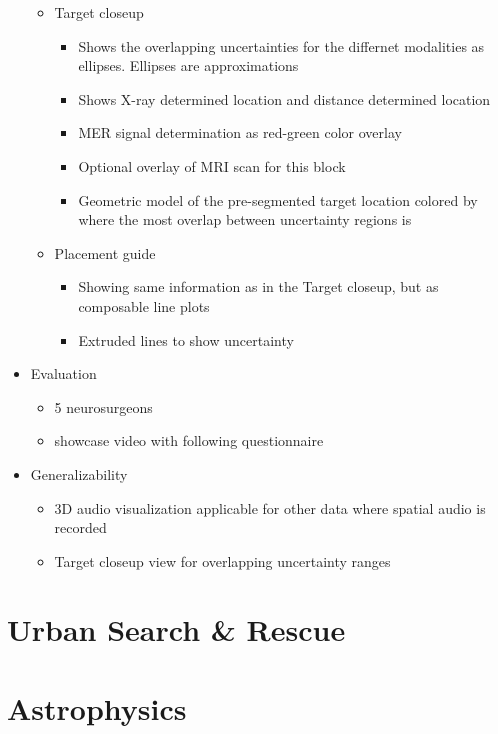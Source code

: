 \begin{itemize}
\begin{itemize}
    \item Target closeup
    \begin{itemize}
        \item Shows the overlapping uncertainties for the differnet modalities as ellipses. Ellipses are approximations
        \item Shows X-ray determined location and distance determined location
        \item MER signal determination as red-green color overlay
        \item Optional overlay of MRI scan for this block
        \item Geometric model of the pre-segmented target location colored by where the most overlap between uncertainty regions is
    \end{itemize}
    \item Placement guide
    \begin{itemize}
        \item Showing same information as in the Target closeup, but as composable line plots
        \item Extruded lines to show uncertainty
    \end{itemize}
\end{itemize}
\item Evaluation
\begin{itemize}
    \item 5 neurosurgeons
    \item showcase video with following questionnaire

\end{itemize}
\item Generalizability
\begin{itemize}
    \item 3D audio visualization applicable for other data where spatial audio is recorded
    \item Target closeup view for overlapping uncertainty ranges
\end{itemize}
\end{itemize}

\section{Urban Search \& Rescue}
\label{contributions:usar}

\section{Astrophysics}
\label{contributions:physics}

